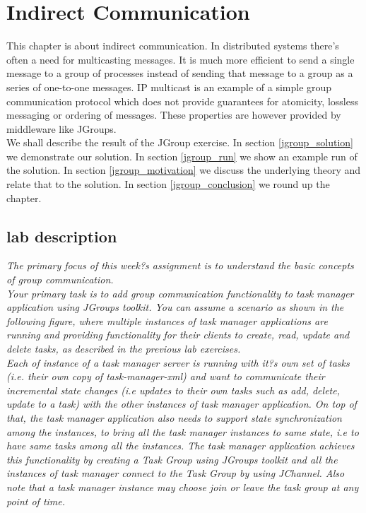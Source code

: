 \chapter{Indirect Communication}
\minitoc


This chapter is about indirect communication. In distributed systems there's often a need for multicasting messages. It is much more efficient to send a single message to a group of processes instead of sending that message to a group as a series of one-to-one messages. IP multicast is an example of a simple group communication protocol which does not provide guarantees for atomicity, lossless messaging or ordering of messages. These properties are however provided by middleware like JGroups.  \\

We shall describe the result of the JGroup exercise. In section \ref{jgroup_solution} we demonstrate our solution. In section \ref{jgroup_run} we show an example run of the solution. In section \ref{jgroup_motivation} we discuss the underlying theory and relate that to the solution. In section \ref{jgroup_conclusion} we round up the chapter.


\section{lab description}

\textit{The primary focus of this week?s assignment is to understand the basic concepts of group communication.} \\

\textit{Your primary task is to add group communication functionality to task manager application using JGroups toolkit. You can assume a scenario as shown in the following figure, where multiple instances of task manager applications are running and providing functionality for their clients to create, read, update and delete tasks, as described in the previous lab exercises.}\\

\textit{Each of instance of a task manager server is running with it?s own set of tasks (i.e. their own copy of task-manager-xml) and want to communicate their incremental state changes (i.e updates to their own tasks such as add, delete, update to a task) with the other instances of task manager application.  On top of that, the task manager application also needs to support state synchronization among the instances, to bring all the task manager instances to same state, i.e to have same tasks among all the instances. The task manager application  achieves this functionality by creating a Task Group using JGroups toolkit and all the instances of task manager connect to the Task Group by using JChannel. Also note that a task manager instance may choose join or leave the task group at any point of time.}\\

